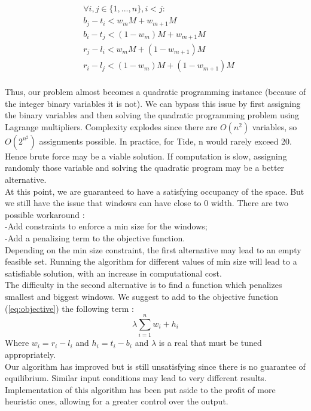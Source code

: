 \documentclass{acmtog}
\begin{document}
\begin{equation}
\begin{split}
&\forall i, j \in \{1,..., n\}, i < j : \\
&b_j - t_i < w_mM + w_{m+1}M \\
&b_i - t_j < (1-w_m)M + w_{m+1}M \\
&r_j - l_i < w_mM + (1-w_{m+1})M \\
&r_i - l_j < (1-w_m)M + (1-w_{m+1})M\\
\end{split}
\end{equation}

Thus, our problem almost becomes a quadratic programming instance (because of the integer binary variables it is not).
We can bypass this issue by first assigning the binary variables and then solving the quadratic programming problem using Lagrange multipliers.  %
Complexity explodes since there are $O(n^2)$ variables, so $O(2^{n^2})$ assignments possible. In practice, for Tide, n would rarely exceed 20. Hence brute force may be a viable solution. If computation is slow, assigning randomly those variable and solving the quadratic program may be a better alternative. \\
At this point, we are guaranteed to have a satisfying occupancy of the space. But we still have the issue that windows can have close to 0 width. There are two possible workaround : \\
-Add constraints to enforce a min size for the windows; \\%
-Add a penalizing term to the objective function. \\
Depending on the min size constraint, the first alternative  may lead to an empty feasible set. Running the algorithm for different values of min size will lead to a satisfiable solution, with an increase in computational cost. \\
The difficulty in the second alternative is to find a function which penalizes smallest and biggest windows. We suggest to add to the objective function (\ref{eq:objective}) the following term :
\begin{equation}
\lambda \sum_{i = 1}^{n}{w_i + h_i}
\end{equation}
 Where $w_i = r_i - l_i$ and $h_i = t_i - b_i$ and $\lambda$ is a real that must be tuned appropriately. \\
Our algorithm has improved but is still unsatisfying since there is no guarantee of equilibrium. %
Similar input conditions may lead to very different results. Implementation of this algorithm has been put aside to the profit of more heuristic ones, allowing for a greater control over the output.
\end{document}
